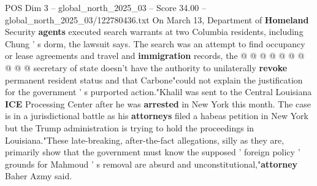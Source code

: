 \begin{textsample}{POS Dim 3 – global\_north\_2025\_03 – Score 34.00 – global\_north\_2025\_03/122780436.txt}
On March 13, Department of \textbf{Homeland} Security \textbf{agents} executed search warrants at two Columbia residents, including Chung ' s dorm, the lawsuit says.
The search was an attempt to find occupancy or lease agreements and travel and \textbf{immigration} records, the @ @ @ @ @ @ @ @ @ @ secretary of state doesn't have the authority to unilaterally \textbf{revoke} permanent resident status and that Carbone"could not explain the justification for the government ' s purported action."Khalil was sent to the Central Louisiana \textbf{ICE} Processing Center after he was \textbf{arrested} in New York this month.
The case is in a jurisdictional battle as his \textbf{attorneys} filed a habeas petition in New York but the Trump administration is trying to hold the proceedings in Louisiana."These late-breaking, after-the-fact allegations, silly as they are, primarily show that the government must know the supposed ' foreign policy ' grounds for Mahmoud ' s removal are absurd and unconstitutional,"\textbf{attorney} Baher Azmy said.

\end{textsample}
